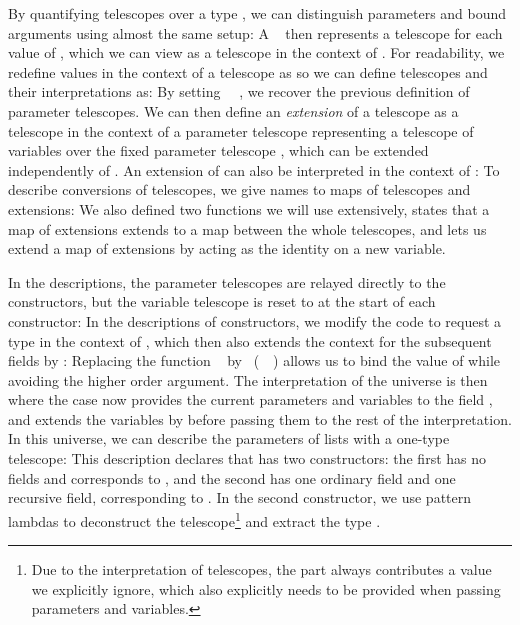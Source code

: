 By quantifying telescopes over a type \cite{practgen, sijsling}, we can distinguish parameters and bound arguments using almost the same setup:
A \  then represents a telescope for each value of , which we can view as a telescope in the context of . For readability, we redefine values in the context of a telescope as
so we can define telescopes and their interpretations as:
By setting \ \AV{=}\ , we recover the previous definition of parameter telescopes. We can then define an \emph{extension} of a telescope as a telescope in the context of a parameter telescope
representing a telescope of variables  over the fixed parameter telescope , which can be extended independently of . An extension of  can also be interpreted in the context of :
To describe conversions of telescopes, we give names to maps of telescopes and extensions:
We also defined two functions we will use extensively,  states that a map of extensions extends to a map between the whole telescopes, and  lets us extend a map of extensions by acting as the identity on a new variable. 

In the descriptions, the parameter telescopes are relayed directly to the constructors, but the variable telescope is reset to  at the start of each constructor:
In the descriptions of constructors, we modify the  code to request a type  in the context of , which then also extends the context for the subsequent fields by :
Replacing the function \  by \ (\ \ ) allows us to bind the value of  while avoiding the higher order argument. The interpretation of the universe is then
where the  case now provides the current parameters and variables to the field , and extends the variables by  before passing them to the rest of the interpretation. In this universe, we can describe the parameters of lists with a one-type telescope:
This description declares that  has two constructors: the first has no fields and corresponds to \AIC{[]}, and the second has one ordinary field and one recursive field, corresponding to . In the second constructor, we use pattern lambdas to deconstruct the telescope\footnote{Due to the interpretation of telescopes, the  part always contributes a value  we explicitly ignore, which also explicitly needs to be provided when passing parameters and variables.} and extract the type . 

